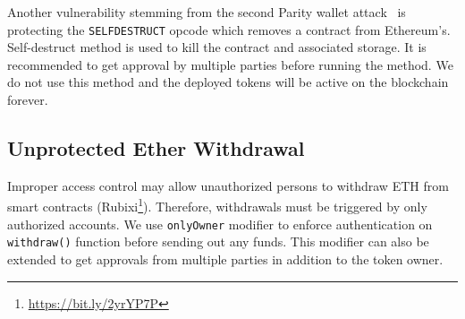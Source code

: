 Another vulnerability stemming from the second Parity wallet attack~\cite{ParitySecondHack} is protecting the \texttt{SELFDESTRUCT} opcode which removes a contract from Ethereum's. Self-destruct method is used to kill the contract and associated storage. It is recommended to get approval by multiple parties before running the method. We do not use this method and the deployed \erc tokens will be active on the blockchain forever.

\subsection{Unprotected Ether Withdrawal}

Improper access control may allow unauthorized persons to withdraw ETH from smart contracts (\cf Rubixi\footnote{\url{https://bit.ly/2yrYP7P}}). Therefore, withdrawals must be triggered by only authorized accounts. We use \texttt{onlyOwner} modifier to enforce authentication on \texttt{withdraw()} function before sending out any funds. {\chg This modifier can also be extended to get approvals from multiple parties in addition to the token owner.}